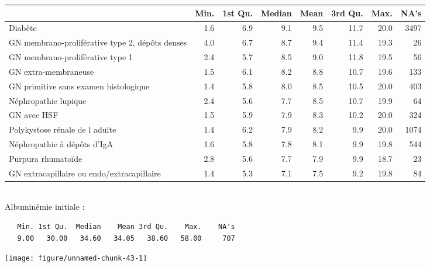 \documentclass[11pt,a4paper]{article}\usepackage[]{graphicx}\usepackage[]{color}
\makeatletter
\def\maxwidth{ %
  \ifdim\Gin@nat@width>\linewidth
    \linewidth
  \else
    \Gin@nat@width
  \fi
}
\newenvironment{kframe}{%
 \def\at@end@of@kframe{}%
 \ifinner\ifhmode%
  \def\at@end@of@kframe{\end{minipage}}%
  \begin{minipage}{\columnwidth}%
 \fi\fi%
 \def\FrameCommand##1{\hskip\@totalleftmargin \hskip-\fboxsep
 \colorbox{shadecolor}{##1}\hskip-\fboxsep
     \hskip-\linewidth \hskip-\@totalleftmargin \hskip\columnwidth}%
 \MakeFramed {\advance\hsize-\width
   \@totalleftmargin\z@ \linewidth\hsize
   \@setminipage}}%
 {\par\unskip\endMakeFramed%
 \at@end@of@kframe}
\newenvironment{knitrout}{}{} %
\makeatother
\begin{document}
\begin{table}[H]
\centering
\begingroup\small
\begin{tabular}{lrrrrrrr}
  \hline
 & Min. & 1st Qu. & Median & Mean & 3rd Qu. & Max. & NA's \\ 
  \hline
Diabète & 1.6 & 6.9 & 9.1 & 9.5 & 11.7 & 20.0 & 3497 \\ 
  GN membrano-proliférative type 2, dépôts denses & 4.0 & 6.7 & 8.7 & 9.4 & 11.4 & 19.3 & 26 \\ 
  GN membrano-proliférative type 1 & 2.4 & 5.7 & 8.5 & 9.0 & 11.8 & 19.5 & 56 \\ 
  GN extra-membraneuse & 1.5 & 6.1 & 8.2 & 8.8 & 10.7 & 19.6 & 133 \\ 
  GN primitive sans examen histologique & 1.4 & 5.8 & 8.0 & 8.5 & 10.5 & 20.0 & 403 \\ 
  Néphropathie lupique & 2.4 & 5.6 & 7.7 & 8.5 & 10.7 & 19.9 & 64 \\ 
  GN avec HSF & 1.5 & 5.9 & 7.9 & 8.3 & 10.2 & 20.0 & 324 \\ 
  Polykystose rénale de l adulte & 1.4 & 6.2 & 7.9 & 8.2 & 9.9 & 20.0 & 1074 \\ 
  Néphropathie à dépôts d'IgA & 1.6 & 5.8 & 7.8 & 8.1 & 9.9 & 19.8 & 544 \\ 
  Purpura rhumatoïde & 2.8 & 5.6 & 7.7 & 7.9 & 9.9 & 18.7 & 23 \\ 
  GN extracapillaire ou endo/extracapillaire & 1.4 & 5.3 & 7.1 & 7.5 & 9.2 & 19.8 & 84 \\ 
   \hline
\end{tabular}
\endgroup
\end{table}

~\\

Albuminémie initiale :

\begin{knitrout}
\color{fgcolor}\begin{kframe}
\begin{verbatim}
   Min. 1st Qu.  Median    Mean 3rd Qu.    Max.    NA's 
   9.00   30.00   34.60   34.05   38.60   58.00     707 
\end{verbatim}
\end{kframe}
\texttt{[image: figure/unnamed-chunk-43-1]} 

\end{knitrout}
\end{document}
